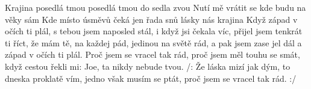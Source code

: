 \begin{TEXT}{Krajina posedlá tmou}
\SLOKA {} posedlá tmou   \NL
{} do sedla zvou    \NL
Nutí mě vrátit se     \NL
kde budu na věky sám   \NL
Kde místo úsměvů  čeká jen řada snů  \NL
{} lásky nás    krajina   
\SLOKA Když západ v očích ti plál, \NL
s tebou jsem naposled stál, \NL
i když jsi čekala víc, \NL
přijel jsem tenkrát ti říct, \NL
že mám tě, na každej pád, jedinou na světě rád, \NL
a pak jsem zase jel dál a západ v očích ti plál. 
\SLOKA Proč jsem se vracel tak rád, \NL
proč jsem měl touhu se smát, \NL
když cestou řekli mi: Joe, ta nikdy nebude tvou. \NL
/: Že láska mizí jak dým, to dneska proklatě vím, \NL
jedno však musím se ptát, \NL
proč jsem se vracel tak rád. :/ \NL
\end{TEXT}
